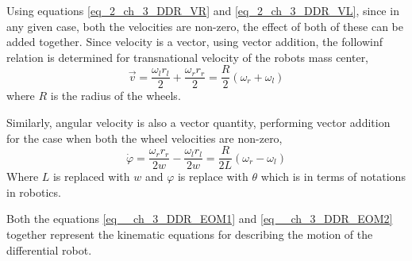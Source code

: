 Using equations \eqref{eq_2_ch_3_DDR_VR} and \eqref{eq_2_ch_3_DDR_VL}, since in any given case, both the velocities are non-zero, the effect of both of these can be added together. Since velocity is a vector, using vector addition, the followinf relation is determined for transnational velocity of the robots mass center,
\begin{equation} \label{eq__ch_3_DDR_EOM1}
	\vec{v} =  \frac{\omega_{l} r_{l}}{2} + \frac{\omega_{r} r_{r}}{2} = \frac{R}{2} \left(\omega_{r} + \omega_{l}\right)
\end{equation}
where $R$ is the radius of the wheels.

Similarly, angular velocity is also a vector quantity, performing vector addition for the case when both the wheel velocities are non-zero,
\begin{equation} \label{eq__ch_3_DDR_EOM2}
	\dot{\varphi} = \frac{\omega_{r} r_{r}}{2w} - \frac{\omega_{l} r_{l}}{2w} = \frac{R}{2L} \left(\omega_{r} - \omega_{l}\right)
\end{equation}
Where $L$ is replaced with $w$ and $\varphi$ is replace with $\theta$ which is in terms of notations in robotics.

Both the equations \eqref{eq__ch_3_DDR_EOM1} and \eqref{eq__ch_3_DDR_EOM2} together represent the kinematic equations for describing the motion of the differential robot.

